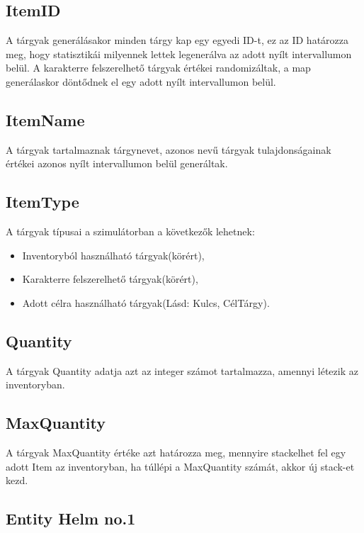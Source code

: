 \subsection{ItemID}

A tárgyak generálásakor minden tárgy kap egy egyedi ID-t, ez az ID határozza meg, hogy statisztikái milyennek lettek legenerálva az adott nyílt intervallumon belül.
A karakterre felszerelhető tárgyak értékei randomizáltak, a map generálaskor döntődnek el egy adott nyílt intervallumon belül.

\subsection{ItemName}

A tárgyak tartalmaznak tárgynevet, azonos nevű tárgyak tulajdonságainak értékei azonos nyílt intervallumon belül generáltak.

\subsection{ItemType}

A tárgyak típusai a szimulátorban a következők lehetnek:
\begin{itemize}
    \item Inventoryból használható tárgyak(körért),
    \item Karakterre felszerelhető tárgyak(körért),
    \item Adott célra használható tárgyak(Lásd: Kulcs, CélTárgy).
\end{itemize}

\subsection{Quantity}

A tárgyak Quantity adatja azt az integer számot tartalmazza, amennyi létezik az inventoryban.

\subsection{MaxQuantity}

A tárgyak MaxQuantity értéke azt határozza meg, mennyire stackelhet fel egy adott Item az inventoryban, ha túllépi a MaxQuantity számát, akkor új stack-et kezd.


\subsection{Entity Helm no.1}

